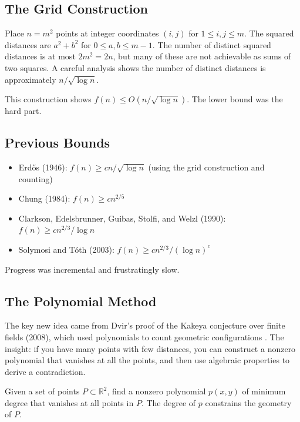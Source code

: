 \subsection{The Grid Construction}

\begin{definition}
Place $n = m^2$ points at integer coordinates $(i,j)$ for $1 \leq i,j \leq m$. The squared distances are $a^2 + b^2$ for $0 \leq a,b \leq m-1$. The number of distinct squared distances is at most $2m^2 = 2n$, but many of these are not achievable as sums of two squares. A careful analysis shows the number of distinct distances is approximately $n/\sqrt{\log n}$.
\end{definition}

This construction shows $f(n) \leq O(n/\sqrt{\log n})$. The lower bound was the hard part.

\subsection{Previous Bounds}

\begin{itemize}
\item Erd\H{o}s (1946): $f(n) \geq cn/\sqrt{\log n}$ (using the grid construction and counting) \cite{erdos1946}
\item Chung (1984): $f(n) \geq cn^{2/5}$ \cite{chung1984}
\item Clarkson, Edelsbrunner, Guibas, Stolfi, and Welzl (1990): $f(n) \geq cn^{2/3}/\log n$ \cite{clarkson1990}
\item Solymosi and T\'oth (2003): $f(n) \geq cn^{2/3}/(\log n)^{c}$ \cite{solymosi2003}
\end{itemize}

Progress was incremental and frustratingly slow.

\subsection{The Polynomial Method}

The key new idea came from Dvir's proof of the Kakeya conjecture over finite fields (2008), which used polynomials to count geometric configurations \cite{dvir2009}. The insight: if you have many points with few distances, you can construct a nonzero polynomial that vanishes at all the points, and then use algebraic properties to derive a contradiction.

\begin{definition}
Given a set of points $P \subset \mathbb{R}^2$, find a nonzero polynomial $p(x,y)$ of minimum degree that vanishes at all points in $P$. The degree of $p$ constrains the geometry of $P$.
\end{definition}

